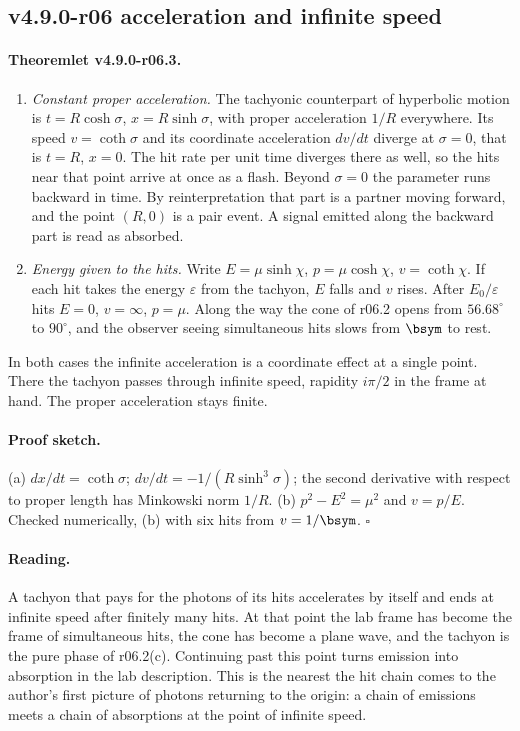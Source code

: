 \subsection*{v4.9.0-r06 acceleration and infinite speed}
\label{subsec:v490-r06-acceleration}

\paragraph{Theoremlet v4.9.0-r06.3.}
\begin{enumerate}[leftmargin=2em]
\item[(a)] \emph{Constant proper acceleration.}  The tachyonic counterpart of hyperbolic motion is
\(t=R\cosh\sigma\), \(x=R\sinh\sigma\), with proper acceleration \(1/R\) everywhere.  Its speed \(v=\coth\sigma\) and its
coordinate acceleration \(dv/dt\) diverge at \(\sigma=0\), that is \(t=R\), \(x=0\).  The hit rate per unit time diverges
there as well, so the hits near that point arrive at once as a flash.  Beyond \(\sigma=0\) the parameter runs backward in
time.  By reinterpretation that part is a partner moving forward, and the point \((R,0)\) is a pair event.  A signal emitted
along the backward part is read as absorbed.
\item[(b)] \emph{Energy given to the hits.}  Write \(E=\mu\sinh\chi\), \(p=\mu\cosh\chi\), \(v=\coth\chi\).  If each hit
takes the energy \(\varepsilon\) from the tachyon, \(E\) falls and \(v\) rises.  After \(E_0/\varepsilon\) hits \(E=0\),
\(v=\infty\), \(p=\mu\).  Along the way the cone of r06.2 opens from \(56.68^\circ\) to \(90^\circ\), and the observer
seeing simultaneous hits slows from \(\bsym\) to rest.
\end{enumerate}
In both cases the infinite acceleration is a coordinate effect at a single point.  There the tachyon passes through infinite
speed, rapidity \(i\pi/2\) in the frame at hand.  The proper acceleration stays finite.

\paragraph{Proof sketch.}
(a) \(dx/dt=\coth\sigma\); \(dv/dt=-1/(R\sinh^3\sigma)\); the second derivative with respect to proper length has Minkowski
norm \(1/R\).  (b) \(p^2-E^2=\mu^2\) and \(v=p/E\).  Checked numerically, (b) with six hits from \(v=1/\bsym\).  \(\square\)

\paragraph{Reading.}
A tachyon that pays for the photons of its hits accelerates by itself and ends at infinite speed after finitely many
hits.  At that point the lab frame has become the frame of simultaneous hits, the cone has become a plane wave, and the
tachyon is the pure phase of r06.2(c).  Continuing past this point turns emission into absorption in the lab description.
This is the nearest the hit chain comes to the author's first picture of photons returning to the origin: a chain of
emissions meets a chain of absorptions at the point of infinite speed.

